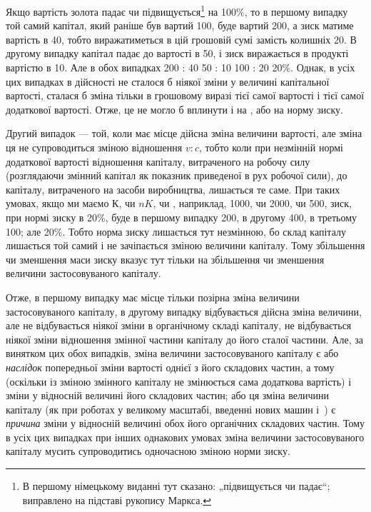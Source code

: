 \parcont{}  %
Якщо вартість золота падає чи підвищується\footnote*{
В першому німецькому виданні тут сказано: „підвищується чи падає“;
виправлено на підставі рукопису Маркса. 
} на 100\%, то
в першому випадку той самий капітал, який раніше був вартий
100, буде вартий 200, а зиск
матиме вартість в 40, тобто виражатиметься
в цій грошовій сумі замість колишніх 20.
В другому випадку капітал падає до вартості в 50, і зиск виражається в продукті вартістю в 10. Але в обох випадках 200 : 40 \deq{} 50 : 10 \deq{} 100 : 20 \deq{} 20\%.
Однак, в усіх цих випадках в дійсності не сталося б ніякої
зміни у величині капітальної вартості, сталася б зміна тільки
в грошовому виразі тієї самої вартості і тієї самої додаткової
вартості. Отже, це не могло б вплинути і на , або на норму
зиску.

Другий випадок — той, коли має місце дійсна зміна величини
вартості, але зміна ця не супроводиться зміною відношення
$v : c$, тобто коли при незмінній нормі додаткової вартості відношення
капіталу, витраченого на робочу силу (розглядаючи
змінний капітал як показник приведеної в рух робочої сили), до
капіталу, витраченого на засоби виробництва, лишається те
саме. При таких умовах, якщо ми маємо $К$, чи $nK$, чи , наприклад,
1000, чи 2000, чи 500, зиск, при нормі зиску в 20\%,
буде в першому випадку \deq{} 200, в другому \deq{} 400, в третьому \deq{} 100;
але  \deq{}  \deq{}  \deq{} 20\%. Тобто норма зиску лишається тут
незмінною, бо склад капіталу лишається той самий і не зачіпається
зміною величини капіталу. Тому збільшення чи зменшення
маси зиску вказує тут тільки на збільшення чи зменшення
величини застосовуваного капіталу.

Отже, в першому випадку має місце тільки позірна зміна
величини застосовуваного капіталу, в другому випадку відбувається
дійсна зміна величини, але не відбувається ніякої зміни
в органічному складі капіталу, не відбувається ніякої зміни
відношення змінної частини капіталу до його сталої частини.
Але, за винятком цих обох випадків, зміна величини застосовуваного
капіталу є або \emph{наслідок} попередньої зміни вартості
однієї з його складових частин, а тому (оскільки із зміною змінного
капіталу не змінюється сама додаткова вартість) і зміни
у відносній величині його складових частин; або ця зміна величини
капіталу (як при роботах у великому масштабі, введенні нових
машин і~) є \emph{причина} зміни у відносній величині обох його
органічних складових частин. Тому в усіх цих випадках при
інших однакових умовах зміна величини застосовуваного капіталу
мусить супроводитись одночасною зміною норми зиску.
